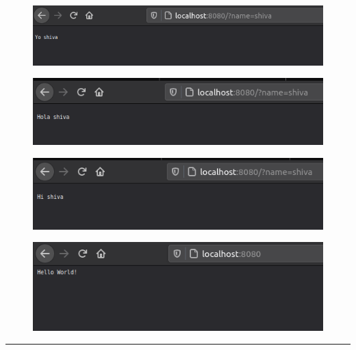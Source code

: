 \documentclass[12pt,letterpaper]{article}
\begin{document}
\subsection*{}
\begin{figure}[h]
    \centering
    \includegraphics[width = \textwidth]{Server/op1.png}
\end{figure}
\begin{figure}[h]
    \centering
    \includegraphics[width = \textwidth]{Server/op2.png}
\end{figure}
\begin{figure}[h]
    \centering
    \includegraphics[width = \textwidth]{Server/op3.png}
\end{figure}
\newpage
\begin{figure}[h]
    \centering
    \includegraphics[width = \textwidth]{Server/op4.png}
\end{figure}

\hrule
\end{document}
